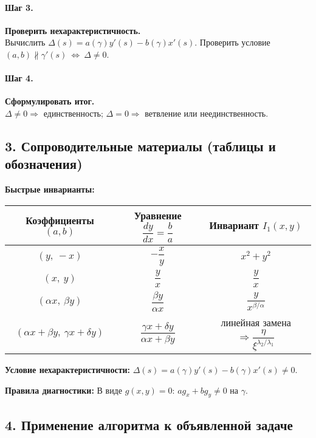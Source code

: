 \paragraph{Шаг 3.} \textbf{Проверить нехарактеристичность.}\\
Вычислить \(\Delta(s)=a(\gamma)y'(s)-b(\gamma)x'(s)\).
Проверить условие \((a,b)\not\parallel \gamma'(s)\ \Leftrightarrow\ \Delta\neq0\).

\paragraph{Шаг 4.} \textbf{Сформулировать итог.}\\
\(\Delta\neq0\Rightarrow\) единственность; \(\Delta=0\Rightarrow\) ветвление или неединственность.

\subsection*{3. Сопроводительные материалы (таблицы и обозначения)}

\textbf{Быстрые инварианты:}
\begin{center}
\begin{tabular}{|c|c|c|}
\hline
\textbf{Коэффициенты } $(a,b)$ & \textbf{Уравнение } $\dfrac{dy}{dx}=\dfrac{b}{a}$ & \textbf{Инвариант } $I_1(x,y)$ \\
\hline
$(y,\ -x)$ & $-\dfrac{x}{y}$ & $x^2+y^2$ \\
\hline
$(x,\ y)$ & $\dfrac{y}{x}$ & $\dfrac{y}{x}$ \\
\hline
$(\alpha x,\ \beta y)$ & $\dfrac{\beta y}{\alpha x}$ & $\dfrac{y}{x^{\beta/\alpha}}$ \\
\hline
$(\alpha x+\beta y,\ \gamma x+\delta y)$ & $\dfrac{\gamma x+\delta y}{\alpha x+\beta y}$ & линейная замена $\Rightarrow \dfrac{\eta}{\xi^{\lambda_2/\lambda_1}}$ \\
\hline
\end{tabular}
\end{center}

\textbf{Условие нехарактеристичности:} \(\Delta(s)=a(\gamma)y'(s)-b(\gamma)x'(s)\neq0\).

\textbf{Правила диагностики:} В виде \(g(x,y)=0\): \(a g_x+b g_y\neq0\) на \(\gamma\).

\subsection*{4. Применение алгоритма к объявленной задаче}

